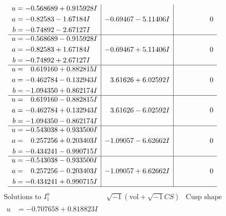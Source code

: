 \documentclass[1p]{elsarticle_modified}
\theoremstyle{definition}
\newcommand{\I}{\sqrt{-1}}
\begin{document}
$$\begin{array}{c|c|c}
\begin{aligned}
u &= -0.568689 + 0.915928 I \\
a &= -0.82583 - 1.67184 I \\
b &= -0.74892 - 2.67127 I\end{aligned}
 & -0.69467 - 5.11406 I & \phantom{-0.000000 } 0 \\ \hline\begin{aligned}
u &= -0.568689 - 0.915928 I \\
a &= -0.82583 + 1.67184 I \\
b &= -0.74892 + 2.67127 I\end{aligned}
 & -0.69467 + 5.11406 I & \phantom{-0.000000 } 0 \\ \hline\begin{aligned}
u &= \phantom{-}0.619160 + 0.882815 I \\
a &= -0.462784 - 0.132943 I \\
b &= -1.094350 + 0.862174 I\end{aligned}
 & \phantom{-}3.61626 + 6.02592 I & \phantom{-0.000000 } 0 \\ \hline\begin{aligned}
u &= \phantom{-}0.619160 - 0.882815 I \\
a &= -0.462784 + 0.132943 I \\
b &= -1.094350 - 0.862174 I\end{aligned}
 & \phantom{-}3.61626 - 6.02592 I & \phantom{-0.000000 } 0 \\ \hline\begin{aligned}
u &= -0.543038 + 0.933500 I \\
a &= \phantom{-}0.257256 + 0.203403 I \\
b &= -0.434241 - 0.990715 I\end{aligned}
 & -1.09057 - 6.62662 I & \phantom{-0.000000 } 0 \\ \hline\begin{aligned}
u &= -0.543038 - 0.933500 I \\
a &= \phantom{-}0.257256 - 0.203403 I \\
b &= -0.434241 + 0.990715 I\end{aligned}
 & -1.09057 + 6.62662 I & \phantom{-0.000000 } 0\\
 \hline 
 \end{array}$$\newpage$$\begin{array}{c|c|c}  
\text{Solutions to }I^u_{1}& \I (\text{vol} + \sqrt{-1}CS) & \text{Cusp shape}\\
 \hline 
\begin{aligned}
u &= -0.707658 + 0.818823 I \\

\end{aligned}
\end{array}$$
\end{document}
